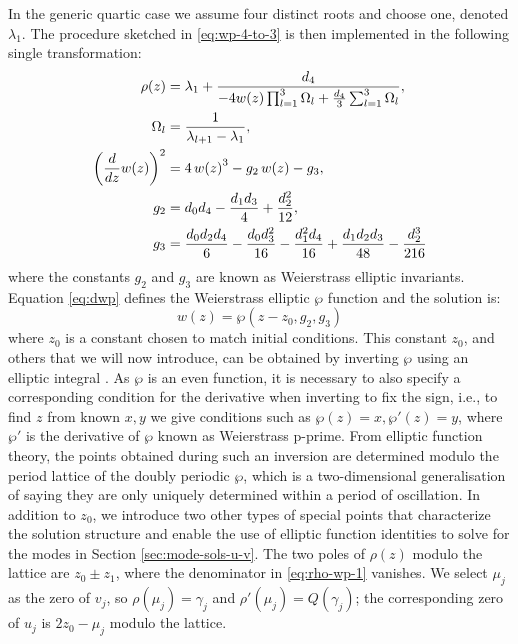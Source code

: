 \documentclass[11pt,a4paper]{article}
\numberwithin{equation}{section}
\begin{document}
In the generic quartic case we assume four distinct roots and choose one, denoted $\lambda_1$.
The procedure sketched in \eqref{eq:wp-4-to-3} is then implemented in the following single transformation:
\begin{align}
\rho{\left(z \right)} &= {\lambda}_{1} + \frac{d_4}{- 4 w{\left(z \right)} \prod_{l=1}^{3} {\Omega}_{l}  + \frac{d_4}{3} \sum_{l=1}^{3} {\Omega}_{l} }, \label{eq:rho-wp-1} \\
\Omega_l &= \frac{1}{\lambda_{l+1} - \lambda_1}, \notag \\
\left(\frac{d}{d z} w{\left(z \right)}\right)^{2} &= 4\,w{\left(z \right)}^3 - g_2\,w{\left(z \right)} - g_3, \label{eq:dwp} \\
g_{2} &= {d}_{0} {d}_{4} - \frac{{d}_{1} {d}_{3}}{4} + \frac{{d}_{2}^{2}}{12}, \label{eq:g2-d} \\
g_{3} &= \frac{{d}_{0} {d}_{2} {d}_{4}}{6} - \frac{{d}_{0} {d}_{3}^{2}}{16} - \frac{{d}_{1}^{2} {d}_{4}}{16} + \frac{{d}_{1} {d}_{2} {d}_{3}}{48} - \frac{{d}_{2}^{3}}{216} \label{eq:3-d}
\end{align}
where the constants $g_2$ and $g_3$ are known as Weierstrass elliptic invariants.
Equation \eqref{eq:dwp} defines the Weierstrass elliptic $\wp$ function and the solution is:
\begin{equation}
w(z) = \wp (z - z_0, g_2, g_3)
\end{equation}
where $z_0$ is a constant chosen to match initial conditions.
This constant $z_0$, and others that we will now introduce, can be obtained by inverting $\wp$ using an elliptic integral \cite{whittakerCourseModernAnalysis2021}.
As $\wp$ is an even function, it is necessary to also specify a corresponding condition for the derivative when inverting to fix the sign, i.e., to find $z$ from known $x,y$ we give conditions such as $\wp\left(z\right)=x, \wp'\left(z\right)=y$, where $\wp'$ is the derivative of $\wp$ known as Weierstrass p-prime.
From elliptic function theory, the points obtained during such an inversion are determined modulo the period lattice of the doubly periodic $\wp$, which is a two-dimensional generalisation of saying they are only uniquely determined within a period of oscillation.
In addition to $z_0$, we introduce two other types of special points that characterize the solution structure and enable the use of elliptic function identities to solve for the modes in Section \ref{sec:mode-sols-u-v}.
The two poles of $\rho(z)$ modulo the lattice are $z_0\pm z_1$, where the denominator in \eqref{eq:rho-wp-1} vanishes.
We select $\mu_j$ as the zero of $v_j$, so $\rho(\mu_j)=\gamma_j$ and $\rho'(\mu_j)=Q(\gamma_j)$; the corresponding zero of $u_j$ is $2z_0-\mu_j$ modulo the lattice.
\end{document}
